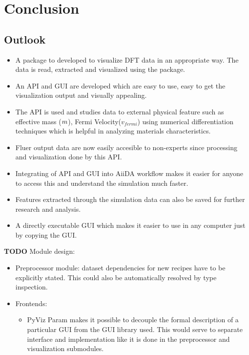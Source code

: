 
\chapter{Conclusion}
\label{chap:conclusion}

\section{Outlook}
\label{sec:outlook}
\begin{itemize}
    \item A package to developed to visualize DFT data in an appropriate way. The data is read, extracted and visualized using the package.
    \item An API and GUI are developed which are easy to use, easy to get the visualization output and visually appealing.
    \item The API is used and studies data to external physical feature such as effective mass ($m\*$), Fermi Velocity($v_{fermi}$) using numerical differentiation techniques which is helpful in analyzing materials characteristics.
    \item Fluer output data are now easily accesible to non-experts since processing and visualization done by this API.
    \item Integrating of API and GUI into AiiDA workflow makes it easier for anyone to access this and understand the simulation much faster.
    \item Features extracted through the simulation data can also be saved for further research and analysis.
    \item A directly executable GUI which makes it easier to use in any computer just by copying the GUI.
\end{itemize}

\textbf{TODO} Module design:
\begin{itemize}
\item Preprocessor module: dataset dependencies for new recipes have to be
    explicitly stated. This could also be automatically resolved by type inspection.
\item Frontends:
    \begin{itemize}
    \item PyViz Param \cite{pyviz-param} makes it possible to decouple the
        formal description of a particular GUI from the GUI library used. This
        would serve to separate interface and implementation like it is done in
        the preprocessor and visualization submodules.
    \end{itemize}
\end{itemize}


